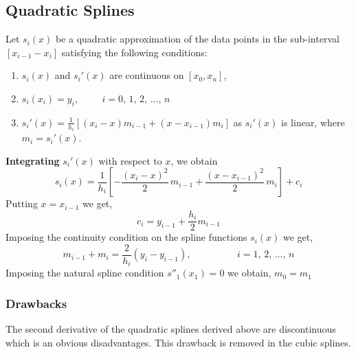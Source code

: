 \documentclass[aima203_lecturenotes_ku.tex]{subfiles}
\begin{document}
\subsection{Quadratic Splines}
Let $s_i(x)$ be a quadratic approximation of the data points in the sub-interval $[x_{i-1} -x_i]$ satisfying the following conditions:
\begin{enumerate}
\item $s_i(x)$ and $s_i'(x)$ are continuous on $[x_0,x_n]$,
\item $s_i(x_i)=y_i, \hspace{1cm} i=0,\, 1,\, 2, \, ..., \, n$
\item $s_i'(x) = \frac{1}{h_i} [ (x_i -x)m_{i-1} + (x-x_{i-1})m_i ]$ as $s_i'(x)$ is linear, where $m_i = s_i'(x)$.
\end{enumerate}
\textbf{Integrating} $s_i'(x)$ with respect to $x$, we obtain
\begin{equation}
  s_i(x) = \frac{1}{h_i} \left [ -\frac{(x_i -x)^2}{2}\, m_{i-1} + \frac{(x-x_{i-1})^2}{2} \, m_i \right ] + c_i
\end{equation}
Putting $x=x_{i-1}$ we get,
\begin{equation}
  c_i = y_{i-1} + \frac{h_i}{2}m_{i-1}
\end{equation}
Imposing the continuity condition on the spline functions $s_i(x)$ we get,
\begin{equation}
  m_{i-1} +m_{i} = \frac{2}{h_i}(y_i -y_{i-1}), \hspace{2cm} i = 1,\, 2, \, ..., \, n
\end{equation}
Imposing the natural spline condition $s''_1(x_1)=0$ we obtain, $ m_0 = m_1$

\subsubsection{Drawbacks}
The second derivative of the quadratic splines derived above are discontinuous which is an obvious disadvantages. This drawback is removed in the cubic splines.
\end{document}
